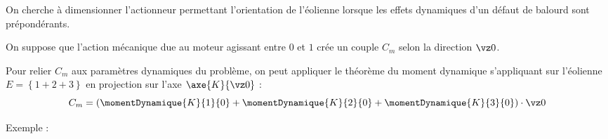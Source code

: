 \documentclass[12pt]{article}
\begin{document}
\begin{minipage}{0.5\textwidth}

On cherche à dimensionner l'actionneur permettant l'orientation de l'éolienne lorsque les effets dynamiques d'un défaut de balourd sont prépondérants.

On suppose que l'action mécanique due au moteur agissant entre $0$ et $1$ crée un couple $C_m$ selon la direction $\vz0$. 

Pour relier $C_m$ aux paramètres dynamiques du problème, on peut appliquer le théorème du moment dynamique s'appliquant sur l'éolienne $E=\left\{1+2+3\right\}$ en projection sur l'axe $\axe{K}{\vz0}$  : 
\[C_m=\left(\momentDynamique{K}{1}{0}+\momentDynamique{K}{2}{0}+\momentDynamique{K}{3}{0}\right)\cdot \vz0\]
\end{minipage}\hfill
\begin{minipage}{0.45\textwidth}
\begin{center}
\end{center}
\end{minipage}

\vspace{1em}
\begin{bclogo}[logo=\bcbook,couleur=DarkOrange!5,arrondi=0.1,sousTitre=Calcul de $\momentDynamique{K}{1}{0}\cdot\vz0$]{Exemple :}
{\vspace{11em}}
\end{bclogo}
\end{document}

